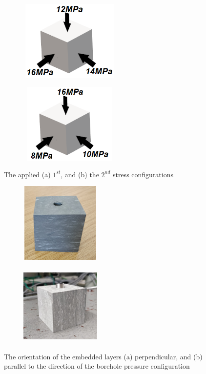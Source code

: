 \begin{figure}[!ht]
\begin{subfigure}[c]{0.48\textwidth}
\centering
\includegraphics[width=5cm,height=4cm]{figures/Amir_Percolation_Stress_1.png}
\subcaption{}
\label{fig:Amir_Percolation_Stress_1}
\end{subfigure}
\hfill
\begin{subfigure}[c]{0.48\textwidth}
\centering
\includegraphics[width=5cm,height=4cm]{figures/Amir_Percolation_Stress_2.png}
\subcaption{}
\label{fig:Amir_Percolation_Stress_2}
\end{subfigure}
\caption{The applied (a) $1^{st}$, and (b) the $2^{nd}$ stress configurations}
\end{figure}

\begin{figure}[!ht]
\begin{subfigure}[c]{0.48\textwidth}
\centering
\includegraphics[width=4cm,height=4cm]{figures/Amir_Percolation_Orientation1.png}
\subcaption{}
\label{fig:Amir_Percolation_Orientation1}
\end{subfigure}
\hfill
\begin{subfigure}[c]{0.48\textwidth}
\centering
\includegraphics[width=4cm,height=4cm]{figures/Amir_Percolation_Orientation2.png}
\subcaption{}
\label{fig:Amir_Percolation_Orientation2}
\end{subfigure}
\caption{The orientation of the embedded layers (a) perpendicular, and (b) parallel to the direction of the borehole pressure configuration}
\end{figure}


